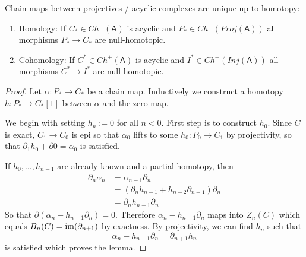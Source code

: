 \documentclass[fontsize=11pt,fleqn,a4paper]{scrartcl}
\begin{document}
\begin{lemma}
Chain maps between projectives / acyclic complexes are unique up to homotopy:
\begin{multicols}{2}
\begin{enumerate}
\item Homology: If $C_\ast\in Ch^-(\mathsf{A})$ is acyclic and $P_\ast\in Ch^-(Proj(\mathsf{A}))$ all morphisms $P_\ast\to C_\ast$ are null-homotopic.
\item Cohomology: If $C^\ast\in Ch^+(\mathsf{A})$ is acyclic and $I^\ast\in Ch^+(Inj(\mathsf{A}))$ all morphisms $C^\ast \to I^\ast$ are null-homotopic.
\end{enumerate}
\end{multicols}
\end{lemma}
\begin{proof}
Let $\alpha: P_\ast\to C_\ast$ be a chain map. Inductively we construct a homotopy $h:P_\ast\to C_\ast[1]$ between $\alpha$ and the zero map.


We begin with setting $h_n:=0$ for all $n<0$. First step is to construct $h_0$. Since $C$ is exact, $C_1\to C_0$ is epi so that $\alpha_0$ lifts to some $h_0: P_0 \to C_1$ by projectivity, so that $\partial_1 h_0 + \partial 0 = \alpha_0$ is satisfied.

If $h_0,\ldots,h_{n-1}$ are already known and a partial homotopy, then
\begin{align*}
\partial_n\alpha_n &= \alpha_{n-1}\partial_n \\
&=(\partial_n h_{n-1} + h_{n-2} \partial_{n-1})\partial_n \\
&=\partial_n h_{n-1} \partial_n
\end{align*}
So that $\partial(\alpha_n - h_{n-1}\partial_n)=0$. Therefore $\alpha_n-h_{n-1}\partial_n$ maps into $Z_n(C)$ which equals $B_n(C)=\operatorname{im}(\partial_{n+1})$ by exactness. By projectivity, we can find $h_n$ such that
\[\alpha_n - h_{n-1}\partial_n = \partial_{n+1} h_n\]
is satisfied which proves the lemma.
\end{proof}
\end{document}
